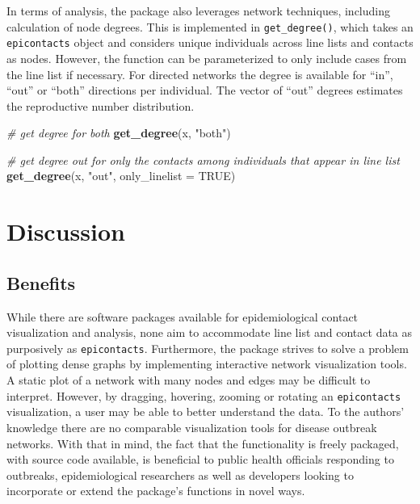 \documentclass[9pt,a4paper,]{extarticle}
\newenvironment{Shaded}{\begin{snugshade}}{\end{snugshade}}
\newcommand{\KeywordTok}[1]{\textcolor[rgb]{0.13,0.29,0.53}{\textbf{#1}}}
\newcommand{\DataTypeTok}[1]{\textcolor[rgb]{0.13,0.29,0.53}{#1}}
\newcommand{\StringTok}[1]{\textcolor[rgb]{0.31,0.60,0.02}{#1}}
\newcommand{\CommentTok}[1]{\textcolor[rgb]{0.56,0.35,0.01}{\textit{#1}}}
\newcommand{\OtherTok}[1]{\textcolor[rgb]{0.56,0.35,0.01}{#1}}
\newcommand{\NormalTok}[1]{#1}
\theoremstyle{definition}
\theoremstyle{definition}
\theoremstyle{definition}
\theoremstyle{remark}
\begin{document}
In terms of analysis, the package also leverages network techniques, including calculation of node degrees. This is implemented in \texttt{get\_degree()}, which takes an \texttt{epicontacts} object and considers unique individuals across line lists and contacts as nodes. However, the function can be parameterized to only include cases from the line list if necessary. For directed networks the degree is available for ``in'', ``out'' or ``both'' directions per individual. The vector of ``out'' degrees estimates the reproductive number distribution\citep{wu:2016}.

\begin{Shaded}
\begin{Highlighting}[]
\CommentTok{# get degree for both}
\KeywordTok{get_degree}\NormalTok{(x, }\StringTok{"both"}\NormalTok{)}

\CommentTok{# get degree out for only the contacts among individuals that appear in line list}
\KeywordTok{get_degree}\NormalTok{(x, }\StringTok{"out"}\NormalTok{, }\DataTypeTok{only_linelist =} \OtherTok{TRUE}\NormalTok{)}
\end{Highlighting}
\end{Shaded}

\section{Discussion}\label{discussion}

\subsection{Benefits}\label{benefits}

While there are software packages available for epidemiological contact visualization and analysis, none aim to accommodate line list and contact data as purposively as \texttt{epicontacts}\citep{noremark:2014}\citep{carroll:2014}\citep{guthrie:2017}. Furthermore, the package strives to solve a problem of plotting dense graphs by implementing interactive network visualization tools. A static plot of a network with many nodes and edges may be difficult to interpret. However, by dragging, hovering, zooming or rotating an \texttt{epicontacts} visualization, a user may be able to better understand the data. To the authors' knowledge there are no comparable visualization tools for disease outbreak networks. With that in mind, the fact that the functionality is freely packaged, with source code available, is beneficial to public health officials responding to outbreaks, epidemiological researchers as well as developers looking to incorporate or extend the package's functions in novel ways.
\end{document}
